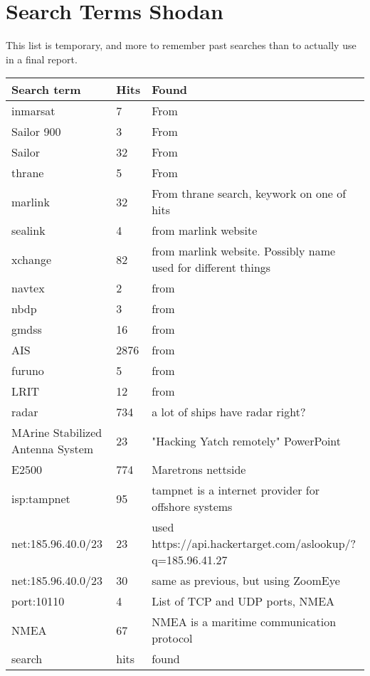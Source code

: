 

\section{Search Terms Shodan} \label{sec:search_term}
This list is temporary, and more to remember past searches than to actually use in a final report.
\begin{table}[H]
\centering
\begin{tabular}{|l|l|l|}
\hline
Search term & Hits & Found \\ \hline
inmarsat & 7 & From \cite{maritime_pen_test} \\ \hline
Sailor 900 & 3 & From \cite{maritime_pen_test} \\ \hline
Sailor & 32 & From \cite{maritime_pen_test} \\ \hline
thrane & 5 & From \cite{maritime_pen_test} \\ \hline
marlink & 32 &  From thrane search, keywork on one of hits \\ \hline
sealink & 4 &  from marlink website\\ \hline
xchange & 82 &  from marlink website. Possibly name used for different things\\ \hline
navtex & 2 &  from \cite{maritime_digitalization}\\ \hline
nbdp & 3 &  from \cite{maritime_digitalization}\\ \hline
gmdss & 16 &  from \cite{maritime_digitalization}\\ \hline
AIS & 2876 &  from \cite{maritime_digitalization}\\ \hline
furuno & 5 &  from \cite{maritime_digitalization}\\ \hline
LRIT & 12 &  from \cite{maritime_digitalization}\\ \hline
radar & 734 &  a lot of ships have radar right?\\ \hline
MArine Stabilized Antenna System & 23 &  "Hacking Yatch remotely" PowerPoint\\ \hline
E2500 & 774 &  Maretrons nettside\\ \hline
isp:tampnet & 95 &  tampnet is a internet provider for offshore systems\\ \hline
net:185.96.40.0/23 & 23 &  used https://api.hackertarget.com/aslookup/?q=185.96.41.27\\ \hline
net:185.96.40.0/23 & 30 &  same as previous, but using ZoomEye\\ \hline

port:10110 & 4 &  List of TCP and UDP ports, NMEA\\ \hline
NMEA & 67 &  NMEA is a maritime communication protocol\\ \hline


search & hits &  found\\ \hline
\end{tabular}
\end{table}


